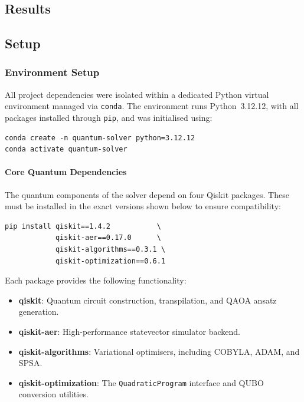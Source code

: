 \documentclass[a4paper]{report}
\begin{document}
{\begin{itemize}
\begin{itemize}



\chapter{Results}

\section{Setup}
\subsection{Environment Setup}

All project dependencies were isolated within a dedicated Python virtual
environment managed via \texttt{conda}. The environment runs Python~3.12.12,
with all packages installed through \texttt{pip}, and was initialised using:

\begin{verbatim}
conda create -n quantum-solver python=3.12.12
conda activate quantum-solver
\end{verbatim}

\subsubsection{Core Quantum Dependencies}

The quantum components of the solver depend on four Qiskit packages. These
must be installed in the exact versions shown below to ensure
compatibility:

\begin{verbatim}
pip install qiskit==1.4.2           \
            qiskit-aer==0.17.0      \
            qiskit-algorithms==0.3.1 \
            qiskit-optimization==0.6.1
\end{verbatim}

Each package provides the following functionality:

\begin{itemize}
    \item \textbf{qiskit}: Quantum circuit construction, transpilation, and
          QAOA ansatz generation.
    \item \textbf{qiskit-aer}: High-performance statevector simulator backend.
    \item \textbf{qiskit-algorithms}: Variational optimisers, including
          COBYLA, ADAM, and SPSA.
    \item \textbf{qiskit-optimization}: The \texttt{QuadraticProgram}
          interface and QUBO conversion utilities.
\end{itemize}


\end{itemize}
\end{itemize}}
\end{document}
